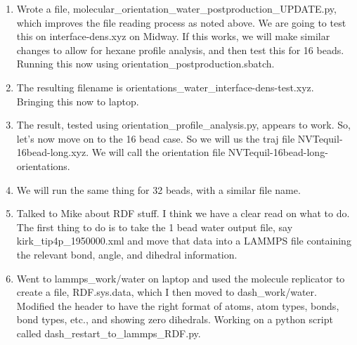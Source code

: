 \documentclass[12pt,reqno]{amsart}
\numberwithin{equation}{section}
\begin{document}
\begin{enumerate}
\item Wrote a file, molecular\_orientation\_water\_postproduction\_UPDATE.py, which improves the file reading process as noted above.  We are going to test this on interface-dens.xyz on Midway.  If this works, we will make similar changes to allow for hexane profile analysis, and then test this for 16 beads.   Running this now using orientation\_postproduction.sbatch.  
\item The resulting filename is orientations\_water\_interface-dens-test.xyz.  Bringing this now to laptop.  
\item The result, tested using orientation\_profile\_analysis.py, appears to work.  So, let's now move on to the 16 bead case.  So we will us the traj file NVTequil-16bead-long.xyz.  We will call the orientation file NVTequil-16bead-long-orientations.   
\item We will run the same thing for 32 beads, with a similar file name.  
\item Talked to Mike about RDF stuff.  I think we have a clear read on what to do.  The first thing to do is to take the 1 bead water output file, say kirk\_tip4p\_1950000.xml and move that data into a LAMMPS file containing the relevant bond, angle, and dihedral information.  
\item Went to lammps\_work/water on laptop and used the molecule replicator to create a file, RDF.sys.data, which I then moved to dash\_work/water.  Modified the header to have the right format of atoms, atom types, bonds, bond types, etc., and showing zero dihedrals. Working on a python script called dash\_restart\_to\_lammps\_RDF.py.    
\end{enumerate}
\end{document}
